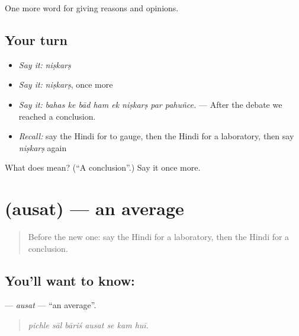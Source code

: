 \begin{grammarlens}[title={What you've built}]
One more word for giving reasons and opinions.
\end{grammarlens}

\subsection*{Your turn}
\begin{itemize}
\raggedright
  \item \emph{Say it:} \emph{niṣkarṣ}
  \item \emph{Say it:} \emph{niṣkarṣ}, once more
  \item \emph{Say it:} \emph{bahas ke bād ham ek niṣkarṣ par pahuñce.} — After the debate we reached a conclusion.
  \item \emph{Recall:} say the Hindi for to gauge, then the Hindi for a laboratory, then say \emph{niṣkarṣ} again
\end{itemize}

\begin{tcolorbox}[breakable,colback=teal!4,colframe=teal!35!black,title={Before you move on}]
What does  mean? (\textquotedblleft{}A conclusion\textquotedblright{}.) Say it once more.
\end{tcolorbox}
\section[\texorpdfstring{\hi{औसत} (ausat)}{औसत (ausat)}]{ (ausat) — an average}

\label{lesson:HI-C362-ausat}



\begin{quote}
Before the new one: say the Hindi for a laboratory, then the Hindi for a conclusion.
\end{quote}

\subsection*{You'll want to know: }
\textbf{} — \emph{ausat} — \textquotedblleft{}an average\textquotedblright{}.

\begin{quote}
      
\end{quote}

\begin{quote}
\emph{pichle sāl bāriś ausat se kam huī.}
\end{quote}

